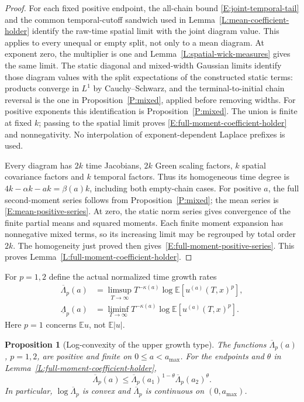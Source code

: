 \documentclass[12pt]{article}
\numberwithin{equation}{section}
\newtheorem{proposition}[theorem]{Proposition}
\theoremstyle{definition}
\newcommand{\E}{\mathbb{E}}
\begin{document}
\begin{proof}
  For each fixed positive endpoint, the all-chain bound
  \eqref{E:joint-temporal-tail} and the common temporal-cutoff sandwich
  used in Lemma~\ref{L:mean-coefficient-holder} identify the raw-time
  spatial limit with the joint diagram value. This applies to every
  unequal or empty split, not only to a mean diagram. At exponent zero,
  the multiplier is one and Lemma~\ref{L:spatial-wick-measures} gives
  the same limit. The static diagonal and mixed-width Gaussian limits
  identify those diagram values with the split expectations of the
  constructed static terms: products converge in \(L^1\) by
  Cauchy--Schwarz, and the terminal-to-initial chain reversal is the one
  in Proposition~\ref{P:mixed}, applied before removing widths.
  For positive exponents this identification
  is Proposition~\ref{P:mixed}. The union is finite at fixed \(k\);
  passing to the spatial limit proves
  \eqref{E:full-moment-coefficient-holder} and nonnegativity.
  No interpolation of exponent-dependent Laplace prefixes is used.

  Every diagram has \(2k\) time Jacobians, \(2k\) Green scaling factors,
  \(k\) spatial covariance factors and \(k\) temporal factors.
  Thus its homogeneous time degree is
  \(4k-\alpha k-ak=\beta(a)k\), including both empty-chain cases.
  For positive \(a\), the full second-moment series follows from
  Proposition~\ref{P:mixed}; the mean series is
  \eqref{E:mean-positive-series}. At zero, the static norm series gives
  convergence of the finite partial means and squared moments. Each
  finite moment expansion has nonnegative mixed terms, so its increasing
  limit may be regrouped by total order \(2k\). The homogeneity just
  proved then gives~\eqref{E:full-moment-positive-series}.
  This proves Lemma~\ref{L:full-moment-coefficient-holder}.
\end{proof}

For \(p=1,2\) define the actual normalized time growth rates
\begin{equation}\label{E:moment-growth-types}
  \begin{split}
    \overline\Lambda_p(a)&=\limsup_{T\to\infty}
    T^{-\kappa(a)}\log\E[u^{(a)}(T,x)^p],\\
    \underline\Lambda_p(a)&=\liminf_{T\to\infty}
    T^{-\kappa(a)}\log\E[u^{(a)}(T,x)^p].
  \end{split}
\end{equation}
Here \(p=1\) concerns \(\E u\), not \(\E|u|\).

\begin{proposition}[Log-convexity of the upper growth type]
  \label{P:moment-growth-logconvex}
  The functions \(\overline\Lambda_p(a)\), \(p=1,2\), are positive and
  finite on \(0\le a<a_{\max}\). For the endpoints and \(\theta\)
  in Lemma~\ref{L:full-moment-coefficient-holder},
  \begin{equation}\label{E:moment-growth-logconvex}
    \overline\Lambda_p(a)\le
    \overline\Lambda_p(a_1)^{1-\theta}
    \overline\Lambda_p(a_2)^\theta .
  \end{equation}
  In particular, \(\log\overline\Lambda_p\) is convex and
  \(\overline\Lambda_p\) is continuous on \((0,a_{\max})\).
\end{proposition}
\end{document}
